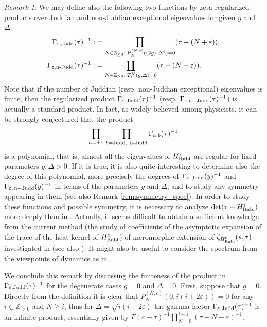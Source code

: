 \documentclass[11pt]{article}
\numberwithin{equation}{section}
\newcommand{\Z}{\mathbb{Z}} %
\newcommand{\e}{\varepsilon}
\newcommand{\HRabi}[1]{H_{\text{\upshape Rabi}}^{#1}} %
\newcommand{\cp}[2]{P^{(#1)}_{#2}} %
\DeclareMathOperator*{\regprod}{\mathchoice%
{\ooalign{\hbox{$\displaystyle\prod$}\crcr\hbox{$\displaystyle\coprod$}}}
{\ooalign{\hbox{$\textstyle\prod$}\crcr\hbox{$\textstyle\coprod$}}}
{\ooalign{\hbox{$\scriptstyle\prod$}\crcr\hbox{$\scriptstyle\coprod$}}}
{\ooalign{\hbox{$\scriptscriptstyle\prod$}\crcr\hbox{$\scriptscriptstyle\coprod$}}}}
\theoremstyle{plain}
\theoremstyle{definition}
\theoremstyle{remark}
\newtheorem{rem}{Remark}[section]
\begin{document}
\begin{rem}
  We may define also the following two  functions by zeta regularized products over Juddian and non-Juddian exceptional eigenvalues for
  given $g$ and $\Delta$:
  \begin{align}
    \Gamma_{\e, \text{Judd}} (\tau)^{-1} :&= \regprod_{N \in \Z_{\geq0}: \; P_N^{(N, \e)}((2g)^,\Delta^2)=0} (\tau-(N+\e)),\\
    \Gamma_{\e, \text{n-Judd}} (\tau)^{-1}:&= \regprod_{N \in \Z_{\geq0}: \; T_{\e}^N(g,\Delta)=0}(\tau-(N+\e)).
  \end{align}
  Note that if the number of Juddian (resp. non-Juddian exceptional) eigenvalues is finite, then the regularized product $\Gamma_{\e, \rm{Judd}} (\tau)^{-1} $
  (resp. $\Gamma_{\e, \rm{n-Judd}} (\tau)^{-1}$) is actually a standard product. In fact, as widely believed among physicists, it can be strongly
  conjectured that the product
  \[
    \prod_{a=\pm\e} \, \prod_{b=\text{Judd, \,n-Judd}} \Gamma_{a, b} (\tau)^{-1}
  \]
  is a polynomial, that is, almost all the eigenvalues of $\HRabi{\e}$ are regular for fixed parameters \(g,\Delta>0\). If it is true, it is also
  quite interesting to determine also the degree of this polynomial, more precisely the degrees of $\Gamma_{\e, \,\rm{Judd}}(y)^{-1}$ and
  $\Gamma_{\e,\,\rm{n-Judd}}(y)^{-1}$ in terms of the parameters $g$ and $\Delta$, and to study any symmetry appearing in them (see also Remark
  \ref{rem:symmetry_spec}). In order to study these functions and possible symmetry, it is necessary to analyze $\det (\tau-\HRabi{\e})$ more
  deeply than in \cite{Sugi2016}. Actually, it seems difficult to obtain a sufficient knowledge from the current method (the study of coefficients
  of the asymptotic expansion of the trace of the heat kernel of $\HRabi{\e}$) of meromorphic extension of $\zeta_{\HRabi{0}}(s,\tau)$ investigated
  in \cite{Sugi2016} (see also \cite{IW2005a,P2010S,Robert1978}). It might also be useful to consider the spectrum from the viewpoints of
  dynamics as in \cite{P2014Milan}.

  We conclude this remark by discussing the finiteness of the product in  \(\Gamma_{\e, \rm{Judd}} (\tau)^{-1}\) for the degenerate cases \(g =0 \) and
  \(\Delta = 0 \). First, suppose that \(g = 0\). Directly from the definition it is clear that \(\cp{N,\e}{N}(0,i(i+2\e)) = 0\) for any
  \(i \in \Z_{>0}\) and \(N \geq i\), thus for \(\Delta = \sqrt{i(i+2\e)}\) the gamma factor \(\Gamma_{\e, \rm{Judd}} (\tau)^{-1}\) is an infinite product, essentially
  given by $\Gamma(\e-\tau)^{-1}\prod_{N=0}^{i-1}(\tau-N-\e)^{-1}$.


\end{rem}
\end{document}
